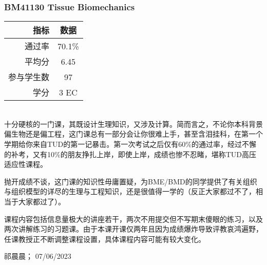 \subsubsection{BM41130 Tissue Biomechanics}
\begin{minipage}{0.45\textwidth}
\centering
{}
\end{minipage}%
\begin{minipage}{0.45\textwidth}
\raggedleft
\begin{tabular}{r|c}
\textbf{指标} & \textbf{数据} \\ \hline
通过率 & 70.1\% \\ 
平均分 & 6.45 \\ 
参与学生数 & 97 \\
学分 & 3 EC\\
\end{tabular}
\end{minipage}\\

十分硬核的一门课，其既设计生理知识，又涉及计算。简而言之，不论你本科背景偏生物还是偏工程，这门课总有一部分会让你很难上手，甚至含泪挂科，在第一个学期给你来自TUD的第一记暴击。第一次考试之后仅有60\%的通过率，经过不懈的补考，又有10\%的朋友挣扎上岸，即使上岸，成绩也惨不忍睹，堪称TUD高压适应性课程。

抛开成绩不谈，这门课的知识性毋庸置疑，为BME/BMD的同学提供了有关组织与组织模型的详尽的生理与工程知识，还是很值得一学的（反正大家都过不了，相当于大家都过了）。

课程内容包括信息量极大的讲座若干，两次不用提交但不写期末傻眼的练习，以及两次讲解练习的习题课。由于本课开课仅两年且因为成绩爆炸导致评教哀鸿遍野，任课教授正不断调整课程设置，具体课程内容可能有较大变化。
\begin{flushright}
祁晨晨； 07/06/2023
\end{flushright}
